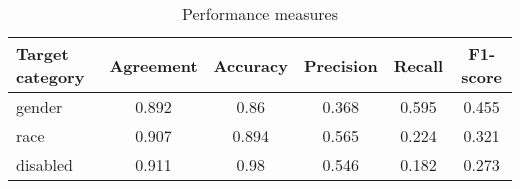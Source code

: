 \begin{table}
\caption{Performance measures}
\label{}
\begin{center}
\begin{tabular}{lccccc}
\hline
Target category             & Agreement     & Accuracy            & Precision   & Recall& F1-score \\
\hline
gender                      & 0.892         & 0.86              & 0.368         &0.595      &0.455           \\
race                        & 0.907         & 0.894             & 0.565         &0.224      & 0.321       \\
disabled                    & 0.911         & 0.98              & 0.546         & 0.182     & 0.273   \\
\hline
\end{tabular}
\end{center}
\end{table}
\bigskip
